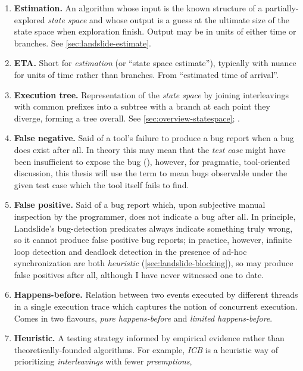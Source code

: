 \begin{enumerate}
	\item {\bf Estimation.}
		An algorithm whose input is the known structure of a partially-explored {\em state space}
		and whose output is a guess at the ultimate size of the state space when exploration finish. %
		Output may be in units of either time or branches.
		See \cref{sec:landslide-estimate}.
	\item {\bf ETA.}
		Short for {\em estimation} (or ``state space estimate''),
		typically with nuance for units of time rather than branches.
		From ``estimated time of arrival''.
	\item {\bf Execution tree.}
		Representation of the {\em state space} by joining interleavings with common prefixes
		into a subtree with a branch at each point they diverge, forming a tree overall.
		See \cref{sec:overview-statespace}; .
	\item {\bf False negative.}
		Said of a tool's failure to produce a bug report when a bug does exist after all.
		In theory this may mean that the {\em test case} might have been insufficient to expose the bug
		(),
		however, for pragmatic, tool-oriented discussion,
		this thesis will use the term to mean bugs observable under the given test case which the tool itself fails to find.
	\item {\bf False positive.}
		Said of a bug report which,
		upon subjective manual inspection by the programmer,
		does not indicate a bug after all.
		In principle, Landslide's bug-detection predicates always indicate something truly wrong,
		so it cannot produce false positive bug reports;
		in practice, however, infinite loop detection and deadlock detection in the presence of ad-hoc synchronization
		are both {\em heuristic} (\cref{sec:landslide-blocking}),
		so may produce false positives after all, although I have never witnessed one to date.
	\item {\bf Happens-before.}
		Relation between two events executed by different threads in a single execution trace
		which captures the notion of concurrent execution.
		Comes in two flavours, {\em pure happens-before} and {\em limited happens-before}.
	\item {\bf Heuristic.}
		A testing strategy informed by empirical evidence rather than theoretically-founded algorithms.
		For example, {\em ICB} is a heuristic way of prioritizing {\em interleavings} with fewer {\em preemptions},

\end{enumerate}
